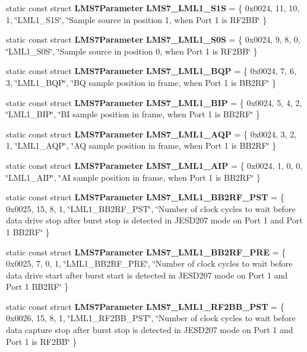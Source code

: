 \begin{DoxyCompactItemize}
\item 
static const struct {\bf L\+M\+S7\+Parameter} {\bf L\+M\+S7\+\_\+\+L\+M\+L1\+\_\+\+S1S} = \{ 0x0024, 11, 10, 1, \char`\"{}\+L\+M\+L1\+\_\+\+S1\+S\char`\"{}, \char`\"{}\+Sample source in position 1, when Port 1 is R\+F2\+B\+B\char`\"{} \}
\item 
static const struct {\bf L\+M\+S7\+Parameter} {\bf L\+M\+S7\+\_\+\+L\+M\+L1\+\_\+\+S0S} = \{ 0x0024, 9, 8, 0, \char`\"{}\+L\+M\+L1\+\_\+\+S0\+S\char`\"{}, \char`\"{}\+Sample source in position 0, when Port 1 is R\+F2\+B\+B\char`\"{} \}
\item 
static const struct {\bf L\+M\+S7\+Parameter} {\bf L\+M\+S7\+\_\+\+L\+M\+L1\+\_\+\+B\+QP} = \{ 0x0024, 7, 6, 3, \char`\"{}\+L\+M\+L1\+\_\+\+B\+Q\+P\char`\"{}, \char`\"{}\+B\+Q sample position in frame, when Port 1 is B\+B2\+R\+F\char`\"{} \}
\item 
static const struct {\bf L\+M\+S7\+Parameter} {\bf L\+M\+S7\+\_\+\+L\+M\+L1\+\_\+\+B\+IP} = \{ 0x0024, 5, 4, 2, \char`\"{}\+L\+M\+L1\+\_\+\+B\+I\+P\char`\"{}, \char`\"{}\+B\+I sample position in frame, when Port 1 is B\+B2\+R\+F\char`\"{} \}
\item 
static const struct {\bf L\+M\+S7\+Parameter} {\bf L\+M\+S7\+\_\+\+L\+M\+L1\+\_\+\+A\+QP} = \{ 0x0024, 3, 2, 1, \char`\"{}\+L\+M\+L1\+\_\+\+A\+Q\+P\char`\"{}, \char`\"{}\+A\+Q sample position in frame, when Port 1 is B\+B2\+R\+F\char`\"{} \}
\item 
static const struct {\bf L\+M\+S7\+Parameter} {\bf L\+M\+S7\+\_\+\+L\+M\+L1\+\_\+\+A\+IP} = \{ 0x0024, 1, 0, 0, \char`\"{}\+L\+M\+L1\+\_\+\+A\+I\+P\char`\"{}, \char`\"{}\+A\+I sample position in frame, when Port 1 is B\+B2\+R\+F\char`\"{} \}
\item 
static const struct {\bf L\+M\+S7\+Parameter} {\bf L\+M\+S7\+\_\+\+L\+M\+L1\+\_\+\+B\+B2\+R\+F\+\_\+\+P\+ST} = \{ 0x0025, 15, 8, 1, \char`\"{}\+L\+M\+L1\+\_\+\+B\+B2\+R\+F\+\_\+\+P\+S\+T\char`\"{}, \char`\"{}\+Number of clock cycles to wait before data drive stop after burst stop is detected in J\+E\+S\+D207 mode on Port 1 and Port 1 B\+B2\+R\+F\char`\"{} \}
\item 
static const struct {\bf L\+M\+S7\+Parameter} {\bf L\+M\+S7\+\_\+\+L\+M\+L1\+\_\+\+B\+B2\+R\+F\+\_\+\+P\+RE} = \{ 0x0025, 7, 0, 1, \char`\"{}\+L\+M\+L1\+\_\+\+B\+B2\+R\+F\+\_\+\+P\+R\+E\char`\"{}, \char`\"{}\+Number of clock cycles to wait before data drive start after burst start is detected in J\+E\+S\+D207 mode on Port 1 and Port 1 B\+B2\+R\+F\char`\"{} \}
\item 
static const struct {\bf L\+M\+S7\+Parameter} {\bf L\+M\+S7\+\_\+\+L\+M\+L1\+\_\+\+R\+F2\+B\+B\+\_\+\+P\+ST} = \{ 0x0026, 15, 8, 1, \char`\"{}\+L\+M\+L1\+\_\+\+R\+F2\+B\+B\+\_\+\+P\+S\+T\char`\"{}, \char`\"{}\+Number of clock cycles to wait before data capture stop after burst stop is detected in J\+E\+S\+D207 mode on Port 1 and Port 1 is R\+F2\+B\+B\char`\"{} \}

\end{DoxyCompactItemize}
